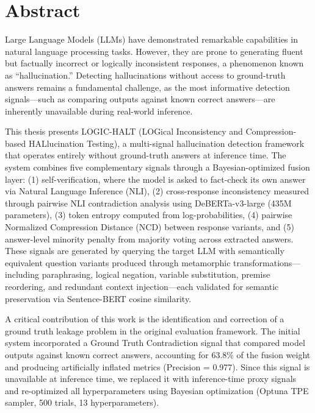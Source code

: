 \chapter*{Abstract}

Large Language Models (LLMs) have demonstrated remarkable capabilities in natural language processing tasks. However, they are prone to generating fluent but factually incorrect or logically inconsistent responses, a phenomenon known as ``hallucination.'' Detecting hallucinations without access to ground-truth answers remains a fundamental challenge, as the most informative detection signals---such as comparing outputs against known correct answers---are inherently unavailable during real-world inference.

This thesis presents LOGIC-HALT (LOGical Inconsistency and Compression-based HALlucination Testing), a multi-signal hallucination detection framework that operates entirely without ground-truth answers at inference time. The system combines five complementary signals through a Bayesian-optimized fusion layer: (1) self-verification, where the model is asked to fact-check its own answer via Natural Language Inference (NLI), (2) cross-response inconsistency measured through pairwise NLI contradiction analysis using DeBERTa-v3-large (435M parameters), (3) token entropy computed from log-probabilities, (4) pairwise Normalized Compression Distance (NCD) between response variants, and (5) answer-level minority penalty from majority voting across extracted answers. These signals are generated by querying the target LLM with semantically equivalent question variants produced through metamorphic transformations---including paraphrasing, logical negation, variable substitution, premise reordering, and redundant context injection---each validated for semantic preservation via Sentence-BERT cosine similarity.

A critical contribution of this work is the identification and correction of a ground truth leakage problem in the original evaluation framework. The initial system incorporated a Ground Truth Contradiction signal that compared model outputs against known correct answers, accounting for 63.8\% of the fusion weight and producing artificially inflated metrics (Precision = 0.977). Since this signal is unavailable at inference time, we replaced it with inference-time proxy signals and re-optimized all hyperparameters using Bayesian optimization (Optuna TPE sampler, 500 trials, 13 hyperparameters).

